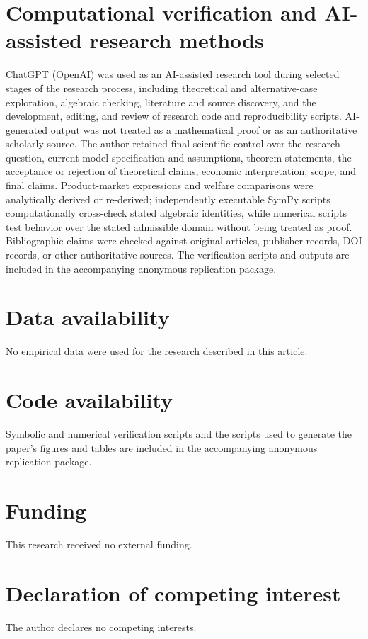 \section*{Computational verification and AI-assisted research methods}
ChatGPT (OpenAI) was used as an AI-assisted research tool during selected stages of the research process, including theoretical and alternative-case exploration, algebraic checking, literature and source discovery, and the development, editing, and review of research code and reproducibility scripts. AI-generated output was not treated as a mathematical proof or as an authoritative scholarly source. The author retained final scientific control over the research question, current model specification and assumptions, theorem statements, the acceptance or rejection of theoretical claims, economic interpretation, scope, and final claims. Product-market expressions and welfare comparisons were analytically derived or re-derived; independently executable SymPy scripts computationally cross-check stated algebraic identities, while numerical scripts test behavior over the stated admissible domain without being treated as proof. Bibliographic claims were checked against original articles, publisher records, DOI records, or other authoritative sources. The verification scripts and outputs are included in the accompanying anonymous replication package.

\section*{Data availability}
No empirical data were used for the research described in this article.

\section*{Code availability}
Symbolic and numerical verification scripts and the scripts used to generate the paper's figures and tables are included in the accompanying anonymous replication package.

\section*{Funding}
This research received no external funding.

\section*{Declaration of competing interest}
The author declares no competing interests.

